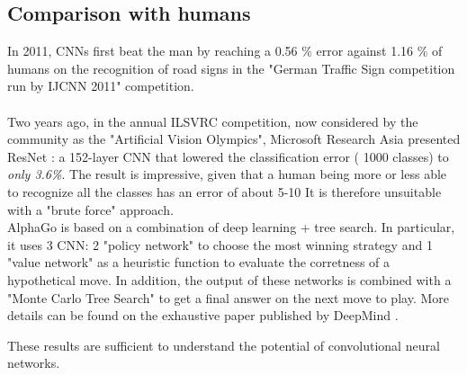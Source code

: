 \subsection{Comparison with humans}In 2011, CNNs first beat the man by reaching a 0.56 \% error against 1.16 \% of humans on the recognition of road signs in the "German Traffic Sign competition run by IJCNN 2011" competition.\\\\Two years ago, in the annual ILSVRC competition, now considered by the community as the "Artificial Vision Olympics", Microsoft Research Asia presented ResNet \parencite{resnet}: a 152-layer CNN that lowered the classification error ( 1000 classes) to \emph{only 3.6\%}. The result is impressive, given that a human being more or less able to recognize all the classes has an error of about 5-10%
It is therefore unsuitable with a "brute force" approach.\\AlphaGo is based on a combination of deep learning + tree search. In particular, it uses 3 CNN: 2 "policy network" to choose the most winning strategy and 1 "value network" as a heuristic function to evaluate the corretness of a hypothetical move. In addition, the output of these networks is combined with a "Monte Carlo Tree Search" to get a final answer on the next move to play. More details can be found on the exhaustive paper published by DeepMind \parencite{AlphaGo}.

These results are sufficient to understand the potential of convolutional neural networks.


